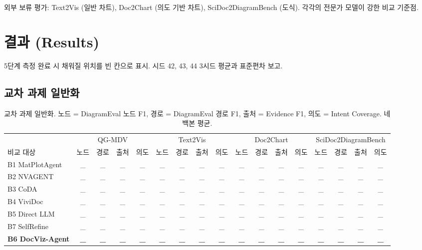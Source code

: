 \documentclass[11pt]{article}
\begin{document}
외부 보류 평가: Text2Vis (일반 차트), Doc2Chart (의도 기반 차트), SciDoc2DiagramBench (도식). 각각의 전문가 모델이 강한 비교 기준점.

\section{결과 (Results)}

5단계 측정 완료 시 채워질 위치를 빈 칸으로 표시. 시드 42, 43, 44 3시드 평균과 표준편차 보고.

\subsection{교차 과제 일반화}

\begin{table}[h]
\centering
\tiny
\begin{tabular}{l|cccc|cccc|cccc|cccc}
\toprule
& \multicolumn{4}{c|}{QG-MDV} & \multicolumn{4}{c|}{Text2Vis} & \multicolumn{4}{c|}{Doc2Chart} & \multicolumn{4}{c}{SciDoc2DiagramBench} \\
비교 대상 & 노드 & 경로 & 출처 & 의도 & 노드 & 경로 & 출처 & 의도 & 노드 & 경로 & 출처 & 의도 & 노드 & 경로 & 출처 & 의도 \\
\midrule
B1 MatPlotAgent & \_ & \_ & \_ & \_ & \_ & \_ & \_ & \_ & \_ & \_ & \_ & \_ & \_ & \_ & \_ & \_ \\
B2 NVAGENT & \_ & \_ & \_ & \_ & \_ & \_ & \_ & \_ & \_ & \_ & \_ & \_ & \_ & \_ & \_ & \_ \\
B3 CoDA & \_ & \_ & \_ & \_ & \_ & \_ & \_ & \_ & \_ & \_ & \_ & \_ & \_ & \_ & \_ & \_ \\
B4 ViviDoc & \_ & \_ & \_ & \_ & \_ & \_ & \_ & \_ & \_ & \_ & \_ & \_ & \_ & \_ & \_ & \_ \\
B5 Direct LLM & \_ & \_ & \_ & \_ & \_ & \_ & \_ & \_ & \_ & \_ & \_ & \_ & \_ & \_ & \_ & \_ \\
B7 SelfRefine & \_ & \_ & \_ & \_ & \_ & \_ & \_ & \_ & \_ & \_ & \_ & \_ & \_ & \_ & \_ & \_ \\
\textbf{B6 DocViz-Agent} & \textbf{\_} & \textbf{\_} & \textbf{\_} & \textbf{\_} & \textbf{\_} & \textbf{\_} & \textbf{\_} & \textbf{\_} & \textbf{\_} & \textbf{\_} & \textbf{\_} & \textbf{\_} & \textbf{\_} & \textbf{\_} & \textbf{\_} & \textbf{\_} \\
\bottomrule
\end{tabular}
\caption{교차 과제 일반화. 노드 = DiagramEval 노드 F1, 경로 = DiagramEval 경로 F1, 출처 = Evidence F1, 의도 = Intent Coverage. 네 백본 평균.}
\label{tab:t1}
\end{table}
\end{document}
